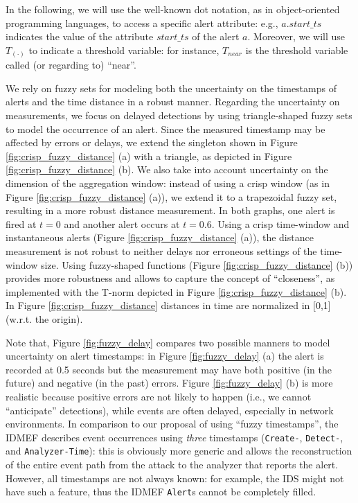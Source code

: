 In the following, we will use the well-known dot notation, as in object-oriented programming languages, to access a specific alert attribute: e.g., $a.start\_ts$ indicates the value of the attribute $start\_ts$ of the alert $a$. Moreover, we will use $T_{(\cdot)}$ to indicate a threshold variable: for instance, $T_{near}$ is the threshold variable called (or regarding to) ``near''.

We rely on fuzzy sets for modeling both the uncertainty on the timestamps of alerts and the time distance in a robust manner. Regarding the uncertainty on measurements, we focus on delayed detections by using triangle-shaped fuzzy sets to model the occurrence of an alert. Since the measured timestamp may be affected by errors or delays, we extend the singleton shown in Figure \ref{fig:crisp_fuzzy_distance} (a) with a triangle, as depicted in Figure \ref{fig:crisp_fuzzy_distance} (b). We also take into account uncertainty on the dimension of the aggregation window: instead of using a crisp window (as in Figure \ref{fig:crisp_fuzzy_distance} (a)), we extend it to a trapezoidal fuzzy set, resulting in a more robust distance measurement. In both graphs, one alert is fired at $t = 0$ and another alert occurs at $t = 0.6$. Using a crisp time-window and instantaneous alerts (Figure \ref{fig:crisp_fuzzy_distance} (a)), the distance measurement is not robust to neither delays nor erroneous settings of the time-window size. Using fuzzy-shaped functions (Figure \ref{fig:crisp_fuzzy_distance} (b)) provides more robustness and allows to capture the concept of ``closeness'', as implemented with the \textsf{T}-norm depicted in Figure \ref{fig:crisp_fuzzy_distance} (b). In Figure \ref{fig:crisp_fuzzy_distance} distances in time are normalized in [0,1] (w.r.t. the origin).

Note that, Figure \ref{fig:fuzzy_delay} compares two possible manners to model uncertainty on alert timestamps: in Figure \ref{fig:fuzzy_delay} (a) the alert is recorded at 0.5 seconds but the measurement may have both positive (in the future) and negative (in the past) errors. Figure \ref{fig:fuzzy_delay} (b) is more realistic because positive errors are not likely to happen (i.e., we cannot ``anticipate'' detections), while events are often delayed, especially in network environments. In comparison to our proposal of using ``fuzzy timestamps'', the \ac{IDMEF} describes event occurrences using \emph{three} timestamps (\texttt{Create-}, \texttt{Detect-}, and \texttt{Analyzer-Time}): this is obviously more generic and allows the reconstruction of the entire event path from the attack to the analyzer that reports the alert. However, all timestamps are not always known: for example, the \ac{IDS} might not have such a feature, thus the \ac{IDMEF} \texttt{Alert}s cannot be completely filled.

